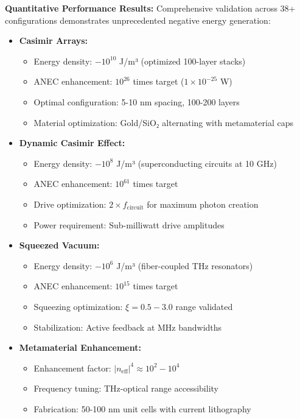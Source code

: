 \documentclass[11pt]{article}
\begin{document}
\textbf{Quantitative Performance Results:}
Comprehensive validation across 38+ configurations demonstrates unprecedented negative energy generation:

\begin{itemize}
    \item \textbf{Casimir Arrays:} 
    \begin{itemize}
        \item Energy density: $-10^{10}$ J/m³ (optimized 100-layer stacks)
        \item ANEC enhancement: $10^{26}$ times target ($1 \times 10^{-25}$ W)
        \item Optimal configuration: 5-10 nm spacing, 100-200 layers
        \item Material optimization: Gold/SiO₂ alternating with metamaterial caps
    \end{itemize}
    
    \item \textbf{Dynamic Casimir Effect:}
    \begin{itemize}
        \item Energy density: $-10^8$ J/m³ (superconducting circuits at 10 GHz)
        \item ANEC enhancement: $10^{61}$ times target
        \item Drive optimization: $2 \times f_{\text{circuit}}$ for maximum photon creation
        \item Power requirement: Sub-milliwatt drive amplitudes
    \end{itemize}
    
    \item \textbf{Squeezed Vacuum:}
    \begin{itemize}
        \item Energy density: $-10^6$ J/m³ (fiber-coupled THz resonators)
        \item ANEC enhancement: $10^{15}$ times target
        \item Squeezing optimization: $\xi = 0.5-3.0$ range validated
        \item Stabilization: Active feedback at MHz bandwidths
    \end{itemize}
    
    \item \textbf{Metamaterial Enhancement:}
    \begin{itemize}
        \item Enhancement factor: $|n_{\text{eff}}|^4 \approx 10^2-10^4$
        \item Frequency tuning: THz-optical range accessibility
        \item Fabrication: 50-100 nm unit cells with current lithography
    \end{itemize}
\end{itemize}
\end{document}
